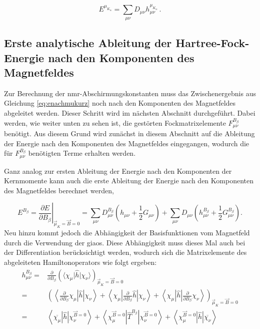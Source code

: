 	\begin{equation}\label{eq:enachmukurz}
	E^{\mu_{K_\alpha}}=\sum_{\mu\nu}D_{\mu\nu}h_{\mu\nu}^{\mu_{K_\alpha}}\, .
	\end{equation}
	
\subsection{Erste analytische Ableitung der Hartree-Fock-Energie nach den Komponenten des Magnetfeldes}
	Zur Berechnung der \ac{nmr}-Abschirmungskonstanten muss das Zwischenergebnis aus Gleichung \ref{eq:enachmukurz} noch nach den Komponenten des Magnetfeldes abgeleitet werden. Dieser Schritt wird im nächsten Abschnitt durchgeführt. Dabei werden, wie weiter unten zu sehen ist, die gestörten Fockmatrixelemente $F_{\mu\nu}^{B_\beta}$ benötigt. Aus diesem Grund wird zunächst in diesem Abschnitt auf die Ableitung der Energie nach den Komponenten des Magnetfeldes eingegangen, wodurch die für $F_{\mu\nu}^{B_\beta}$ benötigten Terme erhalten werden.
	
	Ganz analog zur ersten Ableitung der Energie nach den Komponenten der Kernmomente kann auch die erste Ableitung der Energie nach den Komponenten des Magnetfeldes berechnet werden,
	
	\begin{equation}\label{eq:enachb}
  	  E^{B_\beta}=\left.\frac{\partial E}{\partial B_\beta}\right|_{\vec{\mu}_K=\vec{B}=0}=\sum_{\mu\nu}D_{\mu\nu}^{B_\beta}\left(h_{\mu\nu}+\frac{1}{2}G_{\mu\nu}\right)+\sum_{\mu\nu}D_{\mu\nu}\left(h_{\mu\nu}^{B_\beta}+\frac{1}{2}G_{\mu\nu}^{B_\beta}\right).
  	\end{equation}
  	Neu hinzu kommt jedoch die Abhängigkeit der Basisfunktionen vom Magnetfeld durch die Verwendung der \acp{giao}. Diese Abhängigkeit muss dieses Mal auch bei der Differentiation berücksichtigt werden, wodurch sich die Matrixelemente des abgeleiteten Hamiltonoperators wie folgt ergeben:	
  	     \begin{equation}
     \begin{aligned}
       h_{\mu\nu}^{B_\beta}=&\frac{\partial}{\partial B_\beta}\left(\langle\chi_\mu\vert\hat{h}\vert\chi_\nu\rangle\right)_{\vec{\mu}_K=\vec{B}=0}\\
       =&\left(\left\langle\frac{\partial}{\partial B_\beta}\chi_\mu\left\vert\hat{h}\right\vert\chi_\nu\right\rangle
        +\left\langle\chi_\mu\left\vert\frac{\partial}{\partial B_\beta}\hat{h}\right\vert\chi_\nu\right\rangle
        +\left\langle\chi_\mu\left\vert\hat{h}\right\vert\frac{\partial}{\partial B_\beta}\chi_\nu\right\rangle\right)_{\vec{\mu}_K=\vec{B}=0}\\
       =&\left\langle\overline{\chi_\mu}\left\vert\hat{h}\right\vert\chi_\nu^{\vec{B}=0}\right\rangle
        +\left\langle\chi_\mu^{\vec{B}=0}\left\vert\hat{T}^{B_\beta}\right\vert\chi_\nu^{\vec{B}=0}\right\rangle
        +\left\langle\chi_\mu^{\vec{B}=0}\left\vert\hat{h}\right\vert\overline{\chi_\nu}\right\rangle
     \end{aligned}
     \end{equation}
     
